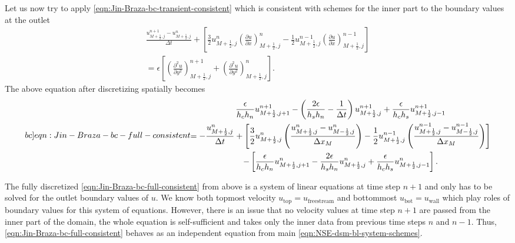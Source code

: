 \documentclass{article}
\numberwithin{equation}{section}
\begin{document}
Let us now try to apply \cref{eqn:Jin-Braza-bc-transient-consistent} which is consistent with schemes for the inner part to the boundary values at the outlet
\begin{equation*}
\begin{gathered}
\frac{{u}^{n+1}_{M+\frac{1}{2},j}-{u}_{M+\frac{1}{2},j}^n}{\Delta t}+\left[\frac{3}{2}{u_{M+\frac{1}{2},j}^n}\left(\frac{\partial {u}}{\partial x}\right)^{n}_{M+\frac{1}{2},j}-\frac{1}{2}{u_{M+\frac{1}{2},j}^{n-1}}\left(\frac{\partial {u}}{\partial x}\right)^{n-1}_{M+\frac{1}{2},j}\right]\\
=\epsilon\left[\left(\frac{\partial^2 {u}}{\partial y^2}\right)^{n+1}_{M+\frac{1}{2},j}+\left(\frac{\partial^2 {u}}{\partial y^2}\right)^{n}_{M+\frac{1}{2},j}\right].
\end{gathered}
\end{equation*}
The above equation after discretizing spatially becomes
\begin{equation}\label[bc]{eqn:Jin-Braza-bc-full-consistent}
\begin{gathered}
\frac{\epsilon}{h_c h_n}u^{n+1}_{M+\frac{1}{2},j+1} - \left(\frac{2\epsilon}{h_s h_n}-\frac{1}{\Delta t}\right)u^{n+1}_{M+\frac{1}{2},j} + \frac{\epsilon}{h_c h_s}u^{n+1}_{M+\frac{1}{2},j-1}\\
=-\frac{{u}_{M+\frac{1}{2},j}^n}{\Delta t}+\left[\frac{3}{2}{u_{M+\frac{1}{2},j}^n}\left(\frac{u_{M+\frac{1}{2},j}^n-u_{M-\frac{1}{2},j}^n}{\Delta x_M}\right)-\frac{1}{2}{u_{M+\frac{1}{2},j}^{n-1}}\left(\frac{u_{M+\frac{1}{2},j}^{n-1}-u_{M-\frac{1}{2},j}^{n-1}}{\Delta x_M}\right)\right]\\
-\left[\frac{\epsilon}{h_c h_n}u^{n}_{M+\frac{1}{2},j+1}-\frac{2\epsilon}{h_s h_n}u^{n}_{M+\frac{1}{2},j} + \frac{\epsilon}{h_c h_s}u^{n}_{M+\frac{1}{2},j-1}\right].
\end{gathered}
\end{equation}

The fully discretized \cref{eqn:Jin-Braza-bc-full-consistent} from above is a system of linear equations at time step $n+1$ and only has to be solved for the outlet boundary values of $u$. We know both topmost velocity $u_{\text{top}}=u_{\text{freestream}}$ and bottommost $u_{\text{bot}}=u_{\text{wall}}$ which play roles of boundary values for this system of equations. However, there is an issue that no velocity values at time step $n+1$ are passed from the inner part of the domain, the whole equation is self-sufficient and takes only the inner data from previous time steps $n$ and $n-1$. Thus, \cref{eqn:Jin-Braza-bc-full-consistent} behaves as an independent equation from main \cref{eqn:NSE-dsm-bl-system-schemes}.
\end{document}
